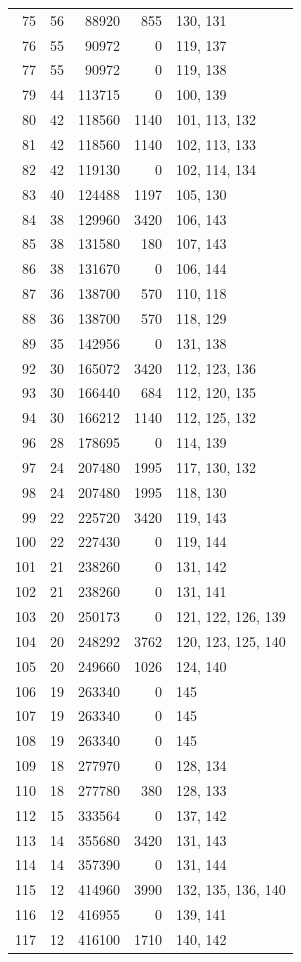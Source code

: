 \documentclass[10pt,a4paper]{article}
\begin{document}
\begin{longtable}{r r r r p{57mm}}
75&56&88920&855&130, 131\\
76&55&90972&0&119, 137\\
77&55&90972&0&119, 138\\
79&44&113715&0&100, 139\\
80&42&118560&1140&101, 113, 132\\
81&42&118560&1140&102, 113, 133\\
82&42&119130&0&102, 114, 134\\
83&40&124488&1197&105, 130\\
84&38&129960&3420&106, 143\\
85&38&131580&180&107, 143\\
86&38&131670&0&106, 144\\
87&36&138700&570&110, 118\\
88&36&138700&570&118, 129\\
89&35&142956&0&131, 138\\
92&30&165072&3420&112, 123, 136\\
93&30&166440&684&112, 120, 135\\
94&30&166212&1140&112, 125, 132\\
96&28&178695&0&114, 139\\
97&24&207480&1995&117, 130, 132\\
98&24&207480&1995&118, 130\\
99&22&225720&3420&119, 143\\
100&22&227430&0&119, 144\\
101&21&238260&0&131, 142\\
102&21&238260&0&131, 141\\
103&20&250173&0&121, 122, 126, 139\\
104&20&248292&3762&120, 123, 125, 140\\
105&20&249660&1026&124, 140\\
106&19&263340&0&145\\
107&19&263340&0&145\\
108&19&263340&0&145\\
109&18&277970&0&128, 134\\
110&18&277780&380&128, 133\\
112&15&333564&0&137, 142\\
113&14&355680&3420&131, 143\\
114&14&357390&0&131, 144\\
115&12&414960&3990&132, 135, 136, 140\\
116&12&416955&0&139, 141\\
117&12&416100&1710&140, 142\\

\end{longtable}
\end{document}
